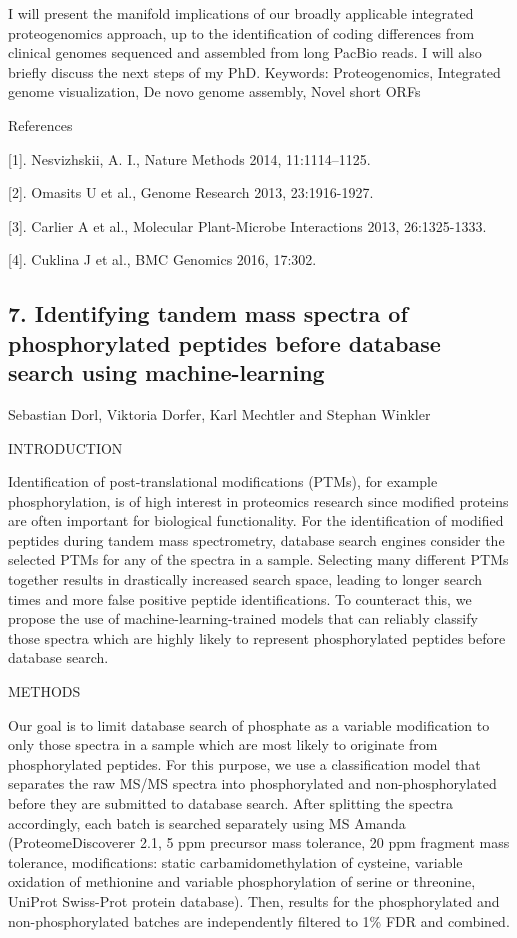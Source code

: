 I will present the manifold implications of our broadly applicable integrated proteogenomics approach, up to the identification of coding differences from clinical genomes sequenced and assembled from long PacBio reads. I will also briefly discuss the next steps of my PhD.
Keywords: Proteogenomics, Integrated genome visualization, De novo genome assembly, Novel short ORFs

References

[1]. Nesvizhskii, A. I., Nature Methods 2014, 11:1114–1125.

[2]. Omasits U et al., Genome Research 2013, 23:1916-1927.

[3]. Carlier A et al., Molecular Plant-Microbe Interactions 2013, 26:1325-1333.

[4]. Cuklina J et al., BMC Genomics 2016, 17:302.

\subsection*{\color{eubicRed} 7. Identifying tandem mass spectra of phosphorylated peptides before database search using machine-learning }
{\color{eubicGray}Sebastian Dorl, Viktoria Dorfer, Karl Mechtler and Stephan Winkler}

INTRODUCTION

Identification of post-translational modifications (PTMs), for example phosphorylation, is of high interest in proteomics research since modified proteins are often important for biological functionality. For the identification of modified peptides during tandem mass spectrometry, database search engines consider the selected PTMs for any of the spectra in a sample. Selecting many different PTMs together results in drastically increased search space, leading to longer search times and more false positive peptide identifications. To counteract this, we propose the use of machine-learning-trained models that can reliably classify those spectra which are highly likely to represent phosphorylated peptides before database search.


METHODS

Our goal is to limit database search of phosphate as a variable modification to only those spectra in a sample which are most likely to originate from phosphorylated peptides. For this purpose, we use a classification model that separates the raw MS/MS spectra into phosphorylated and non-phosphorylated before they are submitted to database search. After splitting the spectra accordingly, each batch is searched separately using MS Amanda (ProteomeDiscoverer 2.1, 5 ppm precursor mass tolerance, 20 ppm fragment mass tolerance, modifications: static carbamidomethylation of cysteine, variable oxidation of methionine and variable phosphorylation of serine or threonine, UniProt Swiss-Prot protein database). Then, results for the phosphorylated and non-phosphorylated batches are independently filtered to 1\% FDR and combined.

